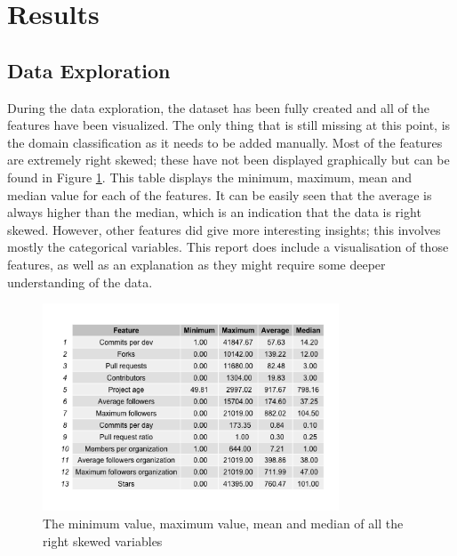 \section{Results}
    \subsection{Data Exploration}
        During the data exploration, the dataset has been fully created and all of the features have been visualized. 
        The only thing that is still missing at this point, is the domain classification as it needs to be added manually.
        Most of the features are extremely right skewed; these have not been displayed graphically but can be found in Figure \ref{fig:right-skewed-features}. This table displays the minimum, maximum, mean and median value for each of the features.
        It can be easily seen that the average is always higher than the median, which is an indication that the data is right skewed.
        However, other features did give more interesting insights; this involves mostly the categorical variables. 
        This report does include a visualisation of those features, as well as an explanation as they might require some deeper understanding of the data.
        
        \begin{figure}[h!]
	        \includegraphics[width=250pt]{figures/data_summary_table}
	        \caption{The minimum value, maximum value, mean and median of all the right skewed variables}
	        \label{fig:right-skewed-features}
	    \end{figure}
        
